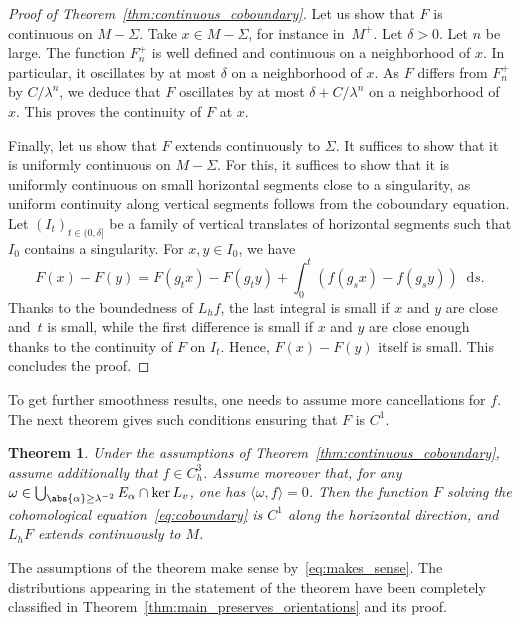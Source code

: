 \documentclass[10pt]{amsart}
\newcommand{\dd}{\mathop{}\!\mathrm{d}}
\newtheorem{thm}{Theorem}[section]
\theoremstyle{definition}
\numberwithin{equation}{section}
\begin{document}
\begin{proof}[Proof of Theorem~\ref{thm:continuous_coboundary}]
Let us show that $F$ is continuous on $M-\Sigma$. Take $x \in M-\Sigma$, for
instance in~$M^+$. Let $\delta>0$. Let $n$ be large. The function $F_n^+$ is
well defined and continuous on a neighborhood of $x$. In particular, it
oscillates by at most $\delta$ on a neighborhood of $x$. As $F$ differs from
$F_n^+$ by $C/\lambda^n$, we deduce that $F$ oscillates by at most
$\delta+C/\lambda^n$ on a neighborhood of $x$. This proves the continuity of
$F$ at $x$.

Finally, let us show that $F$ extends continuously to $\Sigma$. It suffices
to show that it is uniformly continuous on $M-\Sigma$. For this, it suffices
to show that it is uniformly continuous on small horizontal segments close to
a singularity, as uniform continuity along vertical segments follows from the
coboundary equation. Let $(I_t)_{t\in (0,\delta]}$ be a family of vertical
translates of horizontal segments such that $I_0$ contains a singularity. For
$x, y\in I_0$, we have
\[
F(x) - F(y) = F(g_t x)-F(g_t y) + \int_0^t (f(g_s x)
- f(g_s y)) \dd s.
\]
Thanks to the boundedness of $L_h f$, the last integral
is small if $x$ and $y$ are close and~$t$ is small, while the first
difference is small if $x$ and $y$ are close enough thanks to the continuity
of $F$ on $I_t$. Hence, $F(x)-F(y)$ itself is small. This concludes the
proof.
\end{proof}

To get further smoothness results, one needs to assume more cancellations for
$f$. The next theorem gives such conditions ensuring that $F$ is $C^1$.
\begin{thm}
\label{thm:C1_coboundary} Under the assumptions of
Theorem~\ref{thm:continuous_coboundary}, assume additionally that \hbox{$f \in
C^3_h$}. Assume moreover that, for any $\omega \in \bigcup_{\abs{\alpha} \geq
\lambda^{-2}} E_\alpha \cap \ker L_v$, one has $\langle \omega, f \rangle =
0$. Then the function $F$ solving the cohomological
equation~\eqref{eq:coboundary} is $C^1$ along the horizontal direction, and
$L_h F$ extends continuously to $M$.
\end{thm}
The assumptions of the theorem make sense by~\eqref{eq:makes_sense}. The
distributions appearing in the statement of the theorem have been completely
classified in Theorem~\ref{thm:main_preserves_orientations} and its proof.
\end{document}
